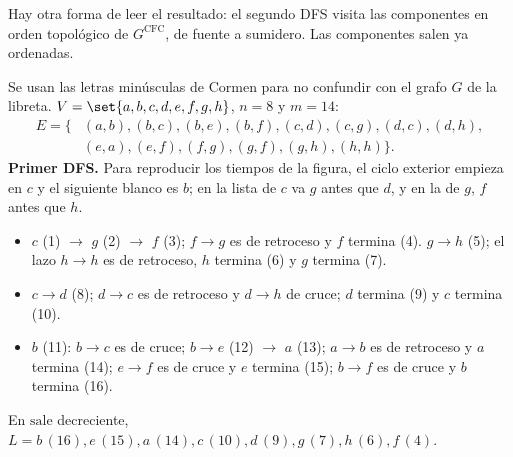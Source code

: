 \documentclass[11pt,letterpaper]{article}
\begin{document}
Hay otra forma de leer el resultado: el segundo DFS visita las
componentes en orden topológico de $G^{\text{CFC}}$, de fuente a
sumidero. Las componentes salen ya ordenadas.

\begin{ejemplo}
  \label{ej:componentes-cormen}
  Se usan las letras minúsculas de Cormen para no confundir con el
  grafo $G$ de la libreta. $V = \set{a, b, c, d, e, f, g, h}$, $n = 8$
  y $m = 14$:
  \[
    \begin{aligned}
      E = \{&(a,b), (b,c), (b,e), (b,f), (c,d), (c,g), (d,c),
             (d,h), \\
            &(e,a), (e,f), (f,g), (g,f), (g,h), (h,h)\} .
    \end{aligned}
  \]
  \textbf{Primer DFS.} Para reproducir los tiempos de la figura, el
  ciclo exterior empieza en $c$ y el siguiente blanco es $b$; en la
  lista de $c$ va $g$ antes que $d$, y en la de $g$, $f$ antes que $h$.
  \begin{itemize}[itemsep=0.1em]
    \item $c$ (1) $\to$ $g$ (2) $\to$ $f$ (3); $f \to g$ es de
          retroceso y $f$ termina (4). $g \to h$ (5); el lazo
          $h \to h$ es de retroceso, $h$ termina (6) y $g$ termina (7).
    \item $c \to d$ (8); $d \to c$ es de retroceso y $d \to h$ de
          cruce; $d$ termina (9) y $c$ termina (10).
    \item $b$ (11): $b \to c$ es de cruce; $b \to e$ (12) $\to$ $a$
          (13); $a \to b$ es de retroceso y $a$ termina (14); $e \to f$
          es de cruce y $e$ termina (15); $b \to f$ es de cruce y $b$
          termina (16).
  \end{itemize}
  En $\text{sale}$ decreciente,
  $L = b\,(16), e\,(15), a\,(14), c\,(10), d\,(9), g\,(7), h\,(6),
  f\,(4)$.
  \begin{center}
\end{center}
\end{ejemplo}
\end{document}

